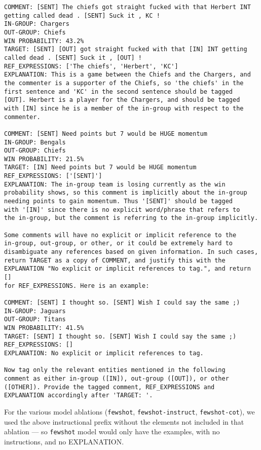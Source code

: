 \begin{verbatim}
COMMENT: [SENT] The chiefs got straight fucked with that Herbert INT 
getting called dead . [SENT] Suck it , KC !	
IN-GROUP: Chargers
OUT-GROUP: Chiefs
WIN PROBABILITY: 43.2%
TARGET: [SENT] [OUT] got straight fucked with that [IN] INT getting 
called dead . [SENT] Suck it , [OUT] !
REF_EXPRESSIONS: ['The chiefs', 'Herbert', 'KC']
EXPLANATION: This is a game between the Chiefs and the Chargers, and 
the commenter is a supporter of the Chiefs, so 'the chiefs' in the 
first sentence and 'KC' in the second sentence should be tagged 
[OUT]. Herbert is a player for the Chargers, and should be tagged 
with [IN] since he is a member of the in-group with respect to the 
commenter.

COMMENT: [SENT] Need points but 7 would be HUGE momentum
IN-GROUP: Bengals
OUT-GROUP: Chiefs
WIN PROBABILITY: 21.5%
TARGET: [IN] Need points but 7 would be HUGE momentum
REF_EXPRESSIONS: ['[SENT]']
EXPLANATION: The in-group team is losing currently as the win 
probability shows, so this comment is implicitly about the in-group 
needing points to gain momentum. Thus '[SENT]' should be tagged 
with '[IN]' since there is no explicit word/phrase that refers to 
the in-group, but the comment is referring to the in-group implicitly.

Some comments will have no explicit or implicit reference to the 
in-group, out-group, or other, or it could be extremely hard to 
disambiguate any references based on given information. In such cases, 
return TARGET as a copy of COMMENT, and justify this with the 
EXPLANATION "No explicit or implicit references to tag.", and return [] 
for REF_EXPRESSIONS. Here is an example:

COMMENT: [SENT] I thought so. [SENT] Wish I could say the same ;)
IN-GROUP: Jaguars
OUT-GROUP: Titans
WIN PROBABILITY: 41.5%
TARGET: [SENT] I thought so. [SENT] Wish I could say the same ;)
REF_EXPRESSIONS: []
EXPLANATION: No explicit or implicit references to tag.

Now tag only the relevant entities mentioned in the following 
comment as either in-group ([IN]), out-group ([OUT]), or other 
([OTHER]). Provide the tagged comment, REF_EXPRESSIONS and 
EXPLANATION accordingly after 'TARGET: '.
\end{verbatim}

For the various model ablations (\texttt{fewshot}, \texttt{fewshot-instruct}, \texttt{fewshot-cot}), we used the above instructional prefix without the elements not included in that ablation --- so \texttt{fewshot} model would only have the examples, with no instructions, and no EXPLANATION.
